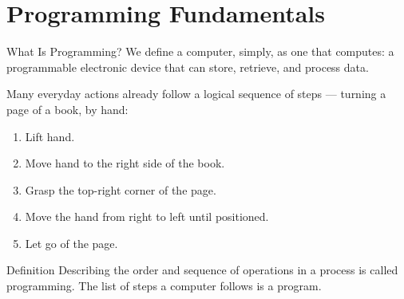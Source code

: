 \documentclass[9pt,aspectratio=169,xcolor=table]{beamer}
\begin{document}
\section{Programming Fundamentals}

\begin{frame}{What Is Programming?}
    \leavevmode
    We define a computer, simply, as \alert{one that computes}: a
    programmable electronic device that can store, retrieve, and process
    data.

    \vspace{3mm}
    Many everyday actions already follow a logical sequence of steps ---
    turning a page of a book, by hand:
    \begin{enumerate}\itemsep1pt
        \item Lift hand.
        \item Move hand to the right side of the book.
        \item Grasp the top-right corner of the page.
        \item Move the hand from right to left until positioned.
        \item Let go of the page.
    \end{enumerate}

    \vspace{2mm}
    \begin{block}{Definition}
        Describing the order and sequence of operations in a process is
        called \alert{programming}. The list of steps a computer follows
        is a \alert{program}.
    \end{block}
\end{frame}
\end{document}
